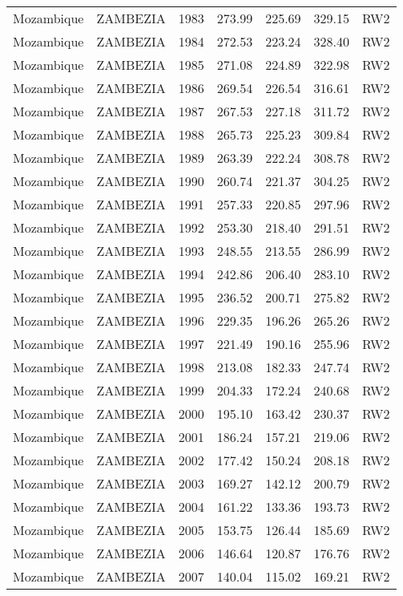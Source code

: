 \begin{longtable}{lllrrrl}
  Mozambique & ZAMBEZIA & 1983 & 273.99 & 225.69 & 329.15 & RW2 \\ 
  Mozambique & ZAMBEZIA & 1984 & 272.53 & 223.24 & 328.40 & RW2 \\ 
  Mozambique & ZAMBEZIA & 1985 & 271.08 & 224.89 & 322.98 & RW2 \\ 
  Mozambique & ZAMBEZIA & 1986 & 269.54 & 226.54 & 316.61 & RW2 \\ 
  Mozambique & ZAMBEZIA & 1987 & 267.53 & 227.18 & 311.72 & RW2 \\ 
  Mozambique & ZAMBEZIA & 1988 & 265.73 & 225.23 & 309.84 & RW2 \\ 
  Mozambique & ZAMBEZIA & 1989 & 263.39 & 222.24 & 308.78 & RW2 \\ 
  Mozambique & ZAMBEZIA & 1990 & 260.74 & 221.37 & 304.25 & RW2 \\ 
  Mozambique & ZAMBEZIA & 1991 & 257.33 & 220.85 & 297.96 & RW2 \\ 
  Mozambique & ZAMBEZIA & 1992 & 253.30 & 218.40 & 291.51 & RW2 \\ 
  Mozambique & ZAMBEZIA & 1993 & 248.55 & 213.55 & 286.99 & RW2 \\ 
  Mozambique & ZAMBEZIA & 1994 & 242.86 & 206.40 & 283.10 & RW2 \\ 
  Mozambique & ZAMBEZIA & 1995 & 236.52 & 200.71 & 275.82 & RW2 \\ 
  Mozambique & ZAMBEZIA & 1996 & 229.35 & 196.26 & 265.26 & RW2 \\ 
  Mozambique & ZAMBEZIA & 1997 & 221.49 & 190.16 & 255.96 & RW2 \\ 
  Mozambique & ZAMBEZIA & 1998 & 213.08 & 182.33 & 247.74 & RW2 \\ 
  Mozambique & ZAMBEZIA & 1999 & 204.33 & 172.24 & 240.68 & RW2 \\ 
  Mozambique & ZAMBEZIA & 2000 & 195.10 & 163.42 & 230.37 & RW2 \\ 
  Mozambique & ZAMBEZIA & 2001 & 186.24 & 157.21 & 219.06 & RW2 \\ 
  Mozambique & ZAMBEZIA & 2002 & 177.42 & 150.24 & 208.18 & RW2 \\ 
  Mozambique & ZAMBEZIA & 2003 & 169.27 & 142.12 & 200.79 & RW2 \\ 
  Mozambique & ZAMBEZIA & 2004 & 161.22 & 133.36 & 193.73 & RW2 \\ 
  Mozambique & ZAMBEZIA & 2005 & 153.75 & 126.44 & 185.69 & RW2 \\ 
  Mozambique & ZAMBEZIA & 2006 & 146.64 & 120.87 & 176.76 & RW2 \\ 
  Mozambique & ZAMBEZIA & 2007 & 140.04 & 115.02 & 169.21 & RW2 \\ 

\end{longtable}
